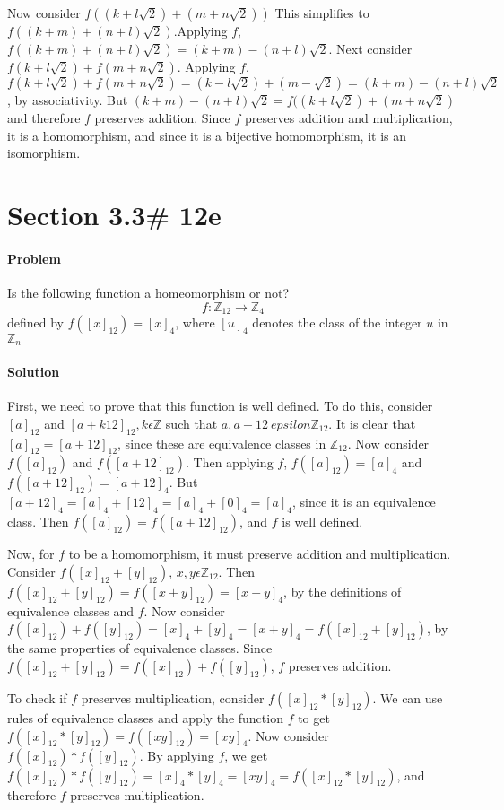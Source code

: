 \documentclass[a4paper,11pt]{article}
\begin{document}
Now consider $f((k+l\sqrt{2}) + (m + n\sqrt{2}))$ This simplifies to $f((k+m) + (n+l)\sqrt{2})$.Applying $f$, $f((k+m) + (n+l)\sqrt{2}) = (k+m) - (n+l)\sqrt{2}$.  Next consider $f(k + l\sqrt{2}) + f(m + n\sqrt{2})$. Applying $f$, $f(k + l\sqrt{2}) + f(m + n\sqrt{2}) = (k-l\sqrt{2}) + (m-\sqrt{2}) = (k+m) - (n+l)\sqrt{2}$, by associativity. But $(k+m) - (n+l)\sqrt{2} = f((k+l\sqrt{2}) + (m+n\sqrt{2})$ and therefore $f$ preserves addition.
 Since $f$ preserves addition and multiplication, it is a homomorphism, and since it is a bijective homomorphism, it is an isomorphism.

\section{Section 3.3\# 12e}
\paragraph{Problem} Is the following function a homeomorphism or not?
\begin{equation}
f: \mathbb{Z}_{12} \rightarrow \mathbb{Z}_4 
\end{equation}
defined by $f([x]_{12}) = [x]_4$, where $[u]_4$ denotes the class of the integer $u$ in $\mathbb{Z}_n$
\paragraph{Solution}
First, we need to prove that this function is well defined. To do this, consider $[a]_{12}$ and $[a+k12]_{12}, k\epsilon\mathbb{Z}$ such that $a, a+12\ epsilon \mathbb{Z}_{12}$. It is clear that $[a]_{12} = [a+12]_{12}$, since these are equivalence classes in $\mathbb{Z}_{12}$. Now consider $f([a]_{12})$ and $f([a+12]_{12})$. Then applying $f$, $f([a]_{12}) = [a]_4$ and $f([a+12]_{12}) = [a+12]_4$. But $[a+12]_4 = [a]_4 + [12]_4 = [a]_4 + [0]_4 = [a]_4$, since it is an equivalence class. Then $f([a]_{12}) = f([a+12]_{12}) $, and $f$ is well defined.

Now, for $f$ to be a homomorphism, it must preserve addition and multiplication. Consider $f([x]_{12} + [y]_{12})$, $x,y \epsilon \mathbb{Z}_{12}$. Then $f([x]_{12} + [y]_{12}) = f([x+y]_{12}) = [x+y]_{4}$, by the definitions of equivalence classes and $f$. Now consider $f([x]_{12}) + f([y]_{12}) = [x]_4 + [y]_4 = [x+y]_4 = f([x]_{12} + [y]_{12})$, by the same properties of equivalence classes. Since $f([x]_{12} + [y]_{12}) = f([x]_{12}) + f([y]_{12})$, $f$ preserves addition.

 To check if $f$ preserves multiplication, consider $f([x]_{12}*[y]_{12})$. We can use rules of equivalence classes and apply the function $f$ to get $f([x]_{12}*[y]_{12}) = f([xy]_{12}) = [xy]_4$. Now consider $f([x]_{12}) * f([y]_{12})$. By applying $f$, we get $f([x]_{12}) * f([y]_{12}) = [x]_4 * [y]_4 = [xy]_4 = f([x]_{12}*[y]_{12})$, and therefore $f$ preserves multiplication.
\end{document}
